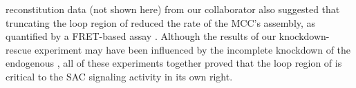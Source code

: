  reconstitution data (not shown here) from our collaborator also suggested that truncating the loop region of  reduced the rate of the MCC's assembly, as quantified by a FRET-based assay \cite{Faesen2017, BUB1-CDC20-MAD1}. Although the results of our knockdown-rescue experiment may have been influenced by the incomplete knockdown of the endogenous , all of these experiments together proved that the loop region of  is critical to the SAC signaling activity in its own right.